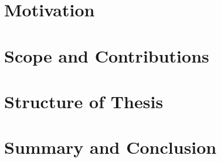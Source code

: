 
\section{Motivation}
\label{sec:Introduction:Motivation}


\section{Scope and Contributions}
\label{sec:Introduction:ScopeAndContributions}


%


\section{Structure of Thesis}
\label{sec:Introduction:StructureOfThesis}


\section{Summary and Conclusion}
\label{sec:Introduction:SummaryAndConclusion}
